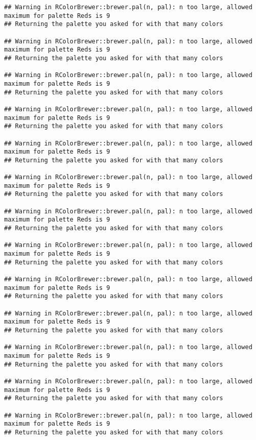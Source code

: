 \documentclass[
]{article}
\begin{document}
\begin{verbatim}
## Warning in RColorBrewer::brewer.pal(n, pal): n too large, allowed maximum for palette Reds is 9
## Returning the palette you asked for with that many colors

## Warning in RColorBrewer::brewer.pal(n, pal): n too large, allowed maximum for palette Reds is 9
## Returning the palette you asked for with that many colors

## Warning in RColorBrewer::brewer.pal(n, pal): n too large, allowed maximum for palette Reds is 9
## Returning the palette you asked for with that many colors

## Warning in RColorBrewer::brewer.pal(n, pal): n too large, allowed maximum for palette Reds is 9
## Returning the palette you asked for with that many colors

## Warning in RColorBrewer::brewer.pal(n, pal): n too large, allowed maximum for palette Reds is 9
## Returning the palette you asked for with that many colors

## Warning in RColorBrewer::brewer.pal(n, pal): n too large, allowed maximum for palette Reds is 9
## Returning the palette you asked for with that many colors

## Warning in RColorBrewer::brewer.pal(n, pal): n too large, allowed maximum for palette Reds is 9
## Returning the palette you asked for with that many colors

## Warning in RColorBrewer::brewer.pal(n, pal): n too large, allowed maximum for palette Reds is 9
## Returning the palette you asked for with that many colors

## Warning in RColorBrewer::brewer.pal(n, pal): n too large, allowed maximum for palette Reds is 9
## Returning the palette you asked for with that many colors

## Warning in RColorBrewer::brewer.pal(n, pal): n too large, allowed maximum for palette Reds is 9
## Returning the palette you asked for with that many colors

## Warning in RColorBrewer::brewer.pal(n, pal): n too large, allowed maximum for palette Reds is 9
## Returning the palette you asked for with that many colors

## Warning in RColorBrewer::brewer.pal(n, pal): n too large, allowed maximum for palette Reds is 9
## Returning the palette you asked for with that many colors

## Warning in RColorBrewer::brewer.pal(n, pal): n too large, allowed maximum for palette Reds is 9
## Returning the palette you asked for with that many colors


\end{verbatim}
\end{document}
